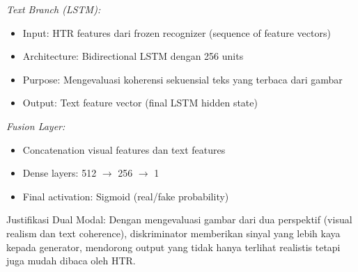 \documentclass[12pt,a4paper]{article}
\begin{document}
\textit{Text Branch (LSTM):}
\begin{itemize}[leftmargin=*, nosep]
\item Input: HTR features dari frozen recognizer (sequence of feature vectors)
\item Architecture: Bidirectional LSTM dengan 256 units
\item Purpose: Mengevaluasi koherensi sekuensial teks yang terbaca dari gambar
\item Output: Text feature vector (final LSTM hidden state)
\end{itemize}

\textit{Fusion Layer:}
\begin{itemize}[leftmargin=*, nosep]
\item Concatenation visual features dan text features
\item Dense layers: 512 $\rightarrow$ 256 $\rightarrow$ 1
\item Final activation: Sigmoid (real/fake probability)
\end{itemize}

Justifikasi Dual Modal: Dengan mengevaluasi gambar dari dua perspektif (visual realism dan text coherence), diskriminator memberikan sinyal yang lebih kaya kepada generator, mendorong output yang tidak hanya terlihat realistis tetapi juga mudah dibaca oleh HTR.
\end{document}
